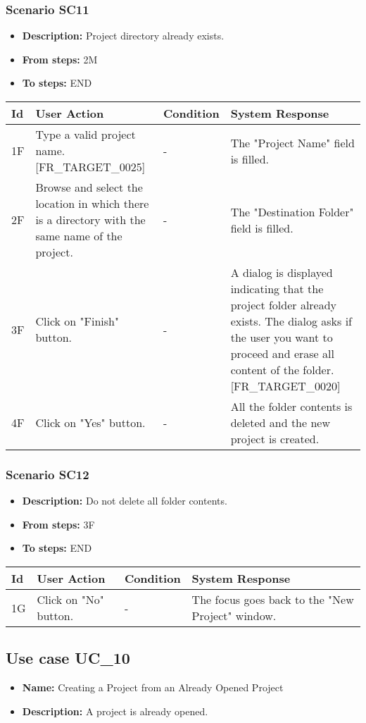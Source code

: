 \documentclass[a4paper,11pt]{article}
\newcommand{\bl}{\\ \hline}
\begin{document}
\subsubsection*{Scenario SC11}
\begin{itemize}
\item {\bf Description:}  Project directory already exists.
\item {\bf From steps:} 2M
\item {\bf To steps:} END
\end{itemize}
\begin{tabular}{|p{0.4in}|p{1.5in}|p{1.5in}|p{1.5in}|}
\hline
Id & User Action & Condition & System Response \bl 
1F & Type a valid project name. [FR_TARGET_0025] & - & The "Project Name" field is filled. \bl
2F & Browse and select the location in which there is a
						directory with the same name of the project. & - & The "Destination Folder" field is filled. \bl
3F & Click on "Finish" button. & - & A dialog is displayed indicating that the project folder
						already exists. The dialog asks if the user you want to proceed
						and erase all content of the folder. [FR_TARGET_0020]\bl
4F & Click on "Yes" button. & - & All the folder contents is deleted and the new project is
						created. \bl
\end{tabular}
\subsubsection*{Scenario SC12}
\begin{itemize}
\item {\bf Description:} Do not delete all folder contents.
\item {\bf From steps:} 3F
\item {\bf To steps:} END
\end{itemize}
\begin{tabular}{|p{0.4in}|p{1.5in}|p{1.5in}|p{1.5in}|}
\hline
Id & User Action & Condition & System Response \bl 
1G & Click on "No" button. & - & The focus goes back to the "New Project" window.
					\bl
\end{tabular}
\subsection*{Use case UC_10}
\begin{itemize}
\item {\bf Name: }Creating a Project from an Already Opened Project
\item {\bf Description: }A project is already opened.
\end{itemize}
\end{document}
